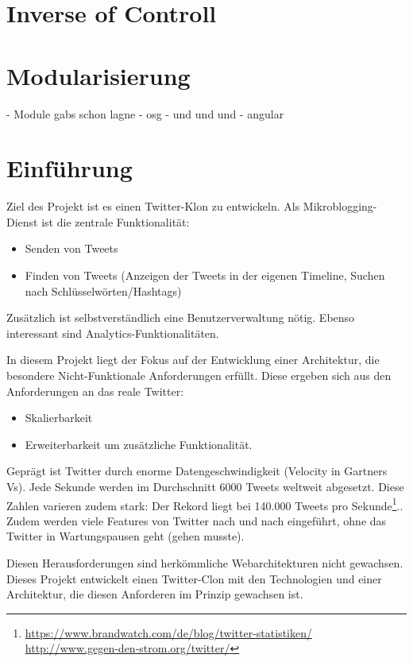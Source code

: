 \section{Inverse of Controll}
\label{sec:inverse_of_controll}

\section{Modularisierung}
\label{sec:modularisierung}
- Module gabs schon lagne 
- osg 
- und und und 
- angular 


\section{Einführung}
Ziel des Projekt ist es einen Twitter-Klon zu entwickeln. Als Mikroblogging-Dienst ist die zentrale Funktionalität:
\begin{itemize}
  \item Senden von Tweets
  \item Finden von Tweets (Anzeigen der Tweets in der eigenen Timeline, Suchen nach Schlüsselwörten/Hashtags)
\end{itemize}
Zusätzlich ist selbstverständlich eine Benutzerverwaltung nötig. Ebenso interessant sind Analytics-Funktionalitäten.

In diesem Projekt liegt der Fokus auf der Entwicklung  einer Architektur, die besondere Nicht-Funktionale Anforderungen
erfüllt. Diese ergeben sich aus den Anforderungen an das reale Twitter:
\begin{itemize}
  \item Skalierbarkeit
  \item Erweiterbarkeit um zusätzliche Funktionalität.
\end{itemize}

Geprägt ist Twitter durch enorme Datengeschwindigkeit (Velocity in Gartners Vs). Jede Sekunde werden im
Durchschnitt 6000 Tweets weltweit abgesetzt. Diese Zahlen varieren zudem
stark: Der Rekord liegt bei 140.000 Tweets pro Sekunde\footnote{\url{https://www.brandwatch.com/de/blog/twitter-statistiken/}
\url{http://www.gegen-den-strom.org/twitter/}}.. Zudem werden viele Features von Twitter nach und nach eingeführt,
ohne das Twitter in Wartungspausen geht (gehen musste).

Diesen Herausforderungen sind herkömmliche Webarchitekturen nicht gewachsen. Dieses Projekt entwickelt einen Twitter-Clon
mit den Technologien und einer Architektur, die diesen Anforderen im Prinzip gewachsen ist.

